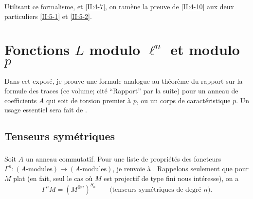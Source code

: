 \documentclass[oneside]{book}
\begin{document}
Utilisant ce formalisme, et \ref{II:4-7}, on ram\`ene la preuve de \ref{II:4-10} 
aux deux particuliers \ref{II:5-1} et \ref{II:5-2}. 




















\chapter{Fonctions \texorpdfstring{$L$}{L} modulo \texorpdfstring{$\ell^n$}{l n} et modulo \texorpdfstring{$p$}{p}}\label{III}

Dans cet expos\'e, je prouve une formule analogue au th\'eor\`eme du rapport sur 
la formule des traces (ce volume; cit\'e ``Rapport'' par la suite) pour un 
anneau de coefficients $A$ qui soit de torsion premier \`a $p$, ou un corps de 
caract\'eristique $p$. Un usage essentiel sera fait de \cite[XVII 5.5]{4}. 










\section{Tenseurs sym\'etriques}\label{III:1}





\subsection{}\label{III:1-1}

Soit $A$ un anneau commutatif. Pour une liste de propri\'et\'es des foncteurs 
$\Gamma^n:(\text{$A$-modules})\to (\text{$A$-modules})$, je renvoie \`a 
\cite[XVII 5.5.1 et 2]{4}. Rappelons seulement que pour $M$ plat (en fait, seul 
le cas o\`u $M$ est projectif de type fini nous int\'eresse), on a 
\[
  \Gamma^n M = \left(M^{\otimes n}\right)^{S_n} \qquad \text{(tenseurs sym\'etriques de degr\'e $n$).}
\]





\subsection{}\label{III:1-2}
\end{document}
